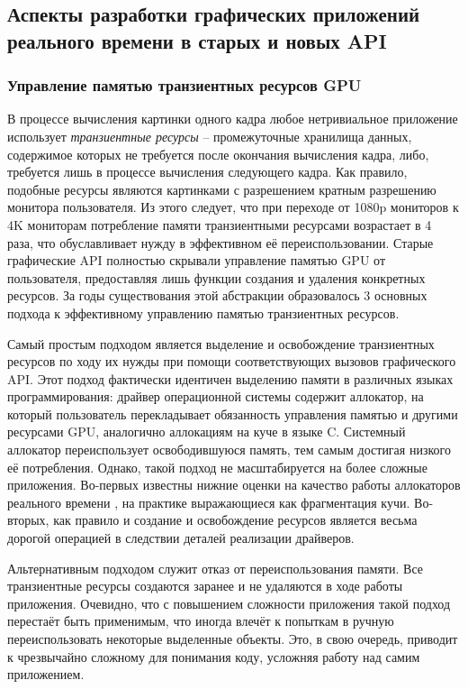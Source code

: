 \subsection{Аспекты разработки графических приложений реального времени в старых и новых API}
\subsubsection{Управление памятью транзиентных ресурсов GPU}
В процессе вычисления картинки одного кадра любое нетривиальное приложение использует \textit{транзиентные ресурсы} -- промежуточные хранилища данных, содержимое которых не требуется после окончания вычисления кадра, либо, требуется лишь в процессе вычисления следующего кадра.
Как правило, подобные ресурсы являются картинками с разрешением кратным разрешению монитора пользователя.
Из этого следует, что при переходе от 1080p мониторов к 4K мониторам потребление памяти транзиентными ресурсами возрастает в 4 раза, что обуславливает нужду в эффективном её переиспользовании.
Старые графические API полностью скрывали управление памятью GPU от пользователя, предоставляя лишь функции создания и удаления конкретных ресурсов.
За годы существования этой абстракции образовалось 3 основных подхода к эффективному управлению памятью транзиентных ресурсов.

Самый простым подходом является выделение и освобождение транзиентных ресурсов по ходу их нужды при помощи соответствующих вызовов графического API.
Этот подход фактически идентичен выделению памяти в различных языках программирования: драйвер операционной системы содержит аллокатор, на который пользователь перекладывает обязанность управления памятью и другими ресурсами GPU, аналогично аллокациям на куче в языке C.
Системный аллокатор переиспользует освободившуюся память, тем самым достигая низкого её потребления.
Однако, такой подход не масштабируется на более сложные приложения. Во-первых известны нижние оценки на качество работы аллокаторов реального времени , на практике выражающиеся как фрагментация кучи.
Во-вторых, как правило и создание и освобождение ресурсов является весьма дорогой операцией в следствии деталей реализации драйверов.

Альтернативным подходом служит отказ от переиспользования памяти. Все транзиентные ресурсы создаются заранее и не удаляются в ходе работы приложения. Очевидно, что с повышением сложности приложения такой подход перестаёт быть применимым, что иногда влечёт к попыткам в ручную переиспользовать некоторые выделенные объекты. Это, в свою очередь, приводит к чрезвычайно сложному для понимания коду, усложняя работу над самим приложением.

